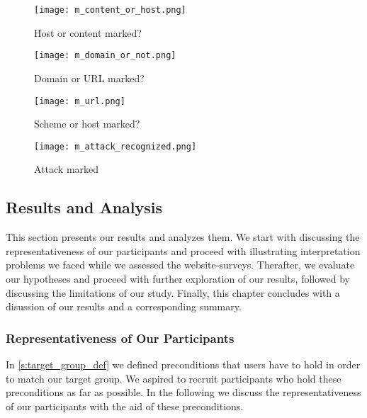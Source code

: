 \begin{figure}[H]
\centering
\texttt{[image: m\_content\_or\_host.png]}
\caption{Host or content marked?}
\label{fig:m_content_or_host}
\end{figure}

\begin{figure}[H]
\centering
\texttt{[image: m\_domain\_or\_not.png]}
\caption{Domain or URL marked?}
\label{fig:m_domain_or_not}
\end{figure}

\begin{figure}[H]
\centering
\texttt{[image: m\_url.png]}
\caption{Scheme or host marked?}
\label{fig:m_url}
\end{figure}

\begin{figure}[H]
\centering
\texttt{[image: m\_attack\_recognized.png]}
\caption{Attack marked}
\label{fig:m_attack_recognized}
\end{figure}

\subsection{Results and Analysis}
This section presents our results and analyzes them. 
We start with discussing the representativeness of our participants and proceed with illustrating interpretation problems we faced while we assessed the website-surveys.
Therafter, we evaluate our hypotheses and proceed with further exploration of our results, followed by discussing the limitations of our study.
Finally, this chapter concludes with a disussion of our results and a corresponding summary. 
\subsubsection{Representativeness of Our Participants}
\label{s:representativeness}
In \autoref{s:target_group_def} we defined preconditions that users have to hold in order to match our target group.
We aspired to recruit participants who hold these preconditions as far as possible.
In the following we discuss the representativeness of our participants with the aid of these preconditions.

